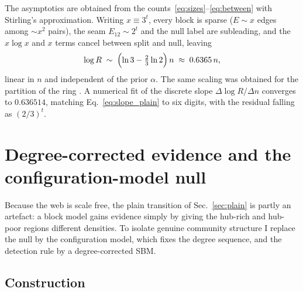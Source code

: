 \documentclass[aps,pre,twocolumn,superscriptaddress,floatfix,nofootinbib]{revtex4-2}
\begin{document}
The asymptotics are obtained from the counts~\eqref{eq:sizes}--\eqref{eq:between}
with Stirling's approximation. Writing $x\equiv 3^{t}$, every block is sparse
($E\sim x$ edges among $\sim x^2$ pairs), the seam $E_{12}\sim 2^{t}$ and the
null label are subleading, and the $x\log x$ and $x$ terms cancel between split
and null, leaving
\begin{equation}
\log R\;\sim\;\Bigl(\ln 3-\tfrac{2}{3}\ln 2\Bigr)\,n
\;\approx\;0.6365\,n ,
\label{eq:slope_plain}
\end{equation}
linear in $n$ and independent of the prior $\alpha$. The same scaling was obtained
for the partition of the ring \cite{vazquez2026ringwantsbroken}. A numerical fit of the discrete slope
$\Delta\log R/\Delta n$ converges to $0.636514$, matching
Eq.~\eqref{eq:slope_plain} to six digits, with the residual falling as
$(2/3)^{t}$.

\section{Degree-corrected evidence and the configuration-model null}
\label{sec:dc}

Because the web is scale free, the plain transition of Sec.~\ref{sec:plain} is
partly an artefact: a block model gains evidence simply by giving the
hub-rich and hub-poor regions different densities. To isolate genuine community
structure I replace the null by the configuration model, which fixes the degree
sequence, and the detection rule by a degree-corrected SBM.

\subsection{Construction}
\end{document}
